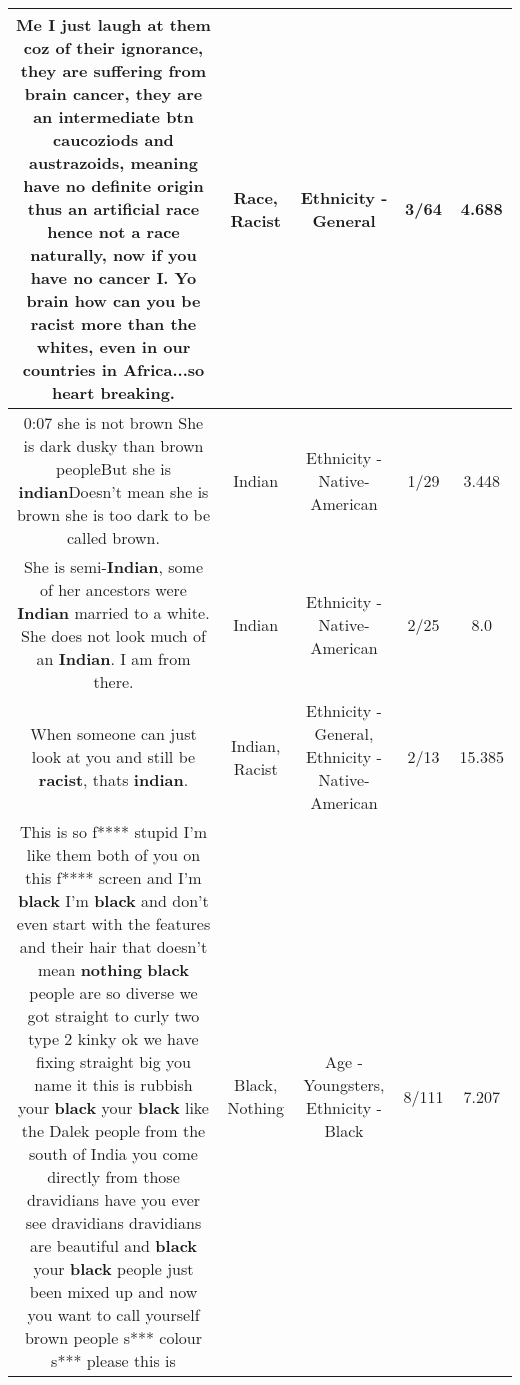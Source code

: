 \documentclass[11pt]{article}
\newlength\mylength
\begin{document}
\begin{center}
\begin{longtable}{|C{.65\mylength}|C{.30\mylength}|C{.12\mylength}|C{.12\mylength}|C{.12\mylength}|}
  \small Me I just laugh at them coz of their ignorance, they are suffering from brain cancer, they are an intermediate btn caucoziods and austrazoids, meaning have no definite origin thus an artificial \textbf{race} hence not a \textbf{race} naturally, now if you have no cancer I. Yo brain how can you be \textbf{racist} more than the whites, even in our countries in Africa...so heart breaking.\normalsize   & Race, Racist & Ethnicity - General & 3/64 & 4.688 \\  \hline
  \small 0:07 she is not brown She is dark dusky than brown peopleBut she is \textbf{indian}Doesn't mean she is brown she is too dark to be called brown.\normalsize   & Indian & Ethnicity - Native-American & 1/29 & 3.448 \\  \hline
  \small She is semi-\textbf{Indian}, some of her ancestors were \textbf{Indian} married to a white. She does not look much of an \textbf{Indian}. I am from there.\normalsize   & Indian & Ethnicity - Native-American & 2/25 & 8.0 \\  \hline
  \small When someone can just look at you and still be \textbf{racist}, thats \textbf{indian}.\normalsize   & Indian, Racist & Ethnicity - General, Ethnicity - Native-American & 2/13 & 15.385 \\  \hline
  \small This is so f**** stupid I'm like them both of you on this f**** screen and I'm \textbf{black} I'm \textbf{black} and don't even start with the features and their hair that doesn't mean \textbf{nothing} \textbf{black} people are so diverse we got straight to curly two type 2 kinky ok we have fixing straight big you name it this is rubbish your \textbf{black} your \textbf{black} like the Dalek people from the south of India you come directly from those dravidians have you ever see dravidians dravidians are beautiful and \textbf{black} your \textbf{black} people just been mixed up and now you want to call yourself brown people s*** colour s*** please this is\normalsize   & Black, Nothing & Age - Youngsters, Ethnicity - Black & 8/111 & 7.207 \\  \hline

\end{longtable}
\end{center}
\end{document}
